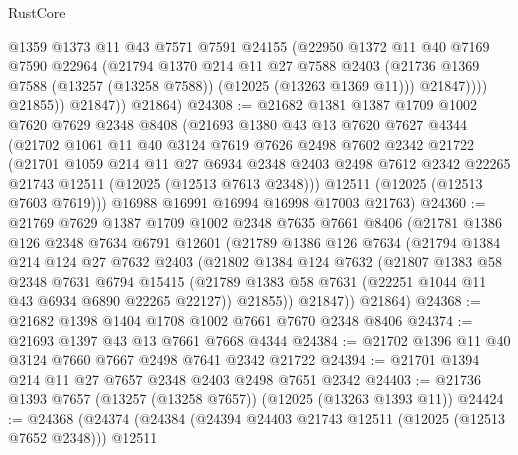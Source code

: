 \begin{lexlean}{RustCore}
\begin{coremodule}
                  @1359
                  @1373
                  @11
                  @43
                  @7571
                  @7591
                  @24155
                  (@22950
                    @1372
                    @11
                    @40
                    @7169
                    @7590
                    @22964
                    (@21794
                      @1370
                      @214
                      @11
                      @27
                      @7588
                      @2403
                      (@21736 @1369 @7588 (@13257 (@13258 @7588)) (@12025 (@13263 @1369 @11)))
                      @21847))))
              @21855))
          @21847))
      @21864)
@24308 := @21682
    @1381
    @1387
    @1709
    @1002
    @7620
    @7629
    @2348
    @8408
    (@21693
      @1380
      @43
      @13
      @7620
      @7627
      @4344
      (@21702
        @1061
        @11
        @40
        @3124
        @7619
        @7626
        @2498
        @7602
        @2342
        @21722
        (@21701
          @1059
          @214
          @11
          @27
          @6934
          @2348
          @2403
          @2498
          @7612
          @2342
          @22265
          @21743
          @12511
          (@12025 (@12513 @7613 @2348)))
        @12511
        (@12025 (@12513 @7603 @7619)))
      @16988
      @16991
      @16994
      @16998
      @17003
      @21763)
@24360 := @21769
    @7629
    @1387
    @1709
    @1002
    @2348
    @7635
    @7661
    @8406
    (@21781
      @1386
      @126
      @2348
      @7634
      @6791
      @12601
      (@21789
        @1386
        @126
        @7634
        (@21794
          @1384
          @214
          @124
          @27
          @7632
          @2403
          (@21802
            @1384
            @124
            @7632
            (@21807
              @1383
              @58
              @2348
              @7631
              @6794
              @15415
              (@21789 @1383 @58 @7631 (@22251 @1044 @11 @43 @6934 @6890 @22265 @22127))
              @21855))
          @21847))
      @21864)
@24368 := @21682 @1398 @1404 @1708 @1002 @7661 @7670 @2348 @8406
@24374 := @21693 @1397 @43 @13 @7661 @7668 @4344
@24384 := @21702 @1396 @11 @40 @3124 @7660 @7667 @2498 @7641 @2342 @21722
@24394 := @21701 @1394 @214 @11 @27 @7657 @2348 @2403 @2498 @7651 @2342
@24403 := @21736 @1393 @7657 (@13257 (@13258 @7657)) (@12025 (@13263 @1393 @11))
@24424 := @24368
    (@24374
      (@24384
        (@24394 @24403 @21743 @12511 (@12025 (@12513 @7652 @2348)))
        @12511

\end{coremodule}
\end{lexlean}
